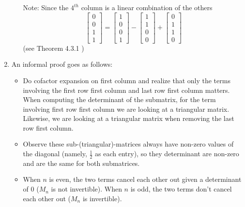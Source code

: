 \documentclass{article}
\begin{document}
\begin{enumerate}[label = (\arabic*)]
\begin{itemize}
		Note: Since the $4^{th}$ column is a linear combination of the others
		\[
			\begin{bmatrix}
			0 \\ 0 \\ 1 \\ 1
			\end{bmatrix} = 
			\begin{bmatrix}
			1 \\ 0 \\ 0 \\ 1
			\end{bmatrix} -
			\begin{bmatrix}
			1 \\ 1 \\ 0 \\ 0
			\end{bmatrix} +
			\begin{bmatrix}
			0 \\ 1 \\ 1 \\ 0
			\end{bmatrix}
		\]
		(see Theorem 4.3.1 \cite[p.~189]{anton})
	\end{itemize}

	\item An informal proof goes as follows:
	\begin{itemize}
		\item Do cofactor expansion on first column and realize that only the terms involving the first row first column and last row first column matters. When computing the determinant of the submatrix, for the term involving first row first column we are looking at a triangular matrix. Likewise, we are looking at a triangular matrix when removing the last row first column. 
		\item Observe these sub-(triangular)-matrices always have non-zero values of the diagonal (namely, $\frac{1}{2}$ as each entry), so they determinant are non-zero and are the same for both submatrices.
		\item When $n$ is even, the two terms cancel each other out given a determinant of $0$ ($M_n$ is not invertible). When $n$ is odd, the two terms don't cancel each other out ($M_n$ is invertible). 
	\end{itemize}
	
	

\end{enumerate}
\end{document}
